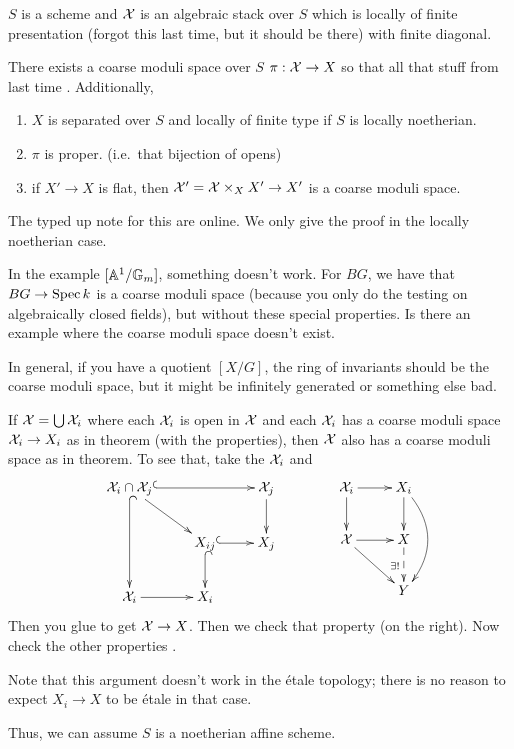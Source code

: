 $S$ is a scheme and $\mathcal{X}$ is an algebraic stack over $S$ which is
locally of finite presentation (forgot this last time, but it should
be there) with finite diagonal.
\begin{theorem}\label{lec38T:some}
  There exists a coarse moduli space over $S$ $\pi:\mathcal{X}\to X$ so that
all that stuff from last time \anton{}. Additionally,
  \begin{enumerate}
   \item $X$ is separated over $S$ and locally of finite type if $S$
is locally noetherian.
   \item $\pi$ is proper. (i.e.~that bijection of opens)
   \item if $X'\to X$ is flat, then $\mathcal{X}'=\mathcal{X}\times_X X'\to X'$ is a
coarse moduli space.
  \end{enumerate}
\end{theorem}
The typed up note for this are online. We only give the proof in the
locally noetherian case.

In the example $[\mathbb{A}^1/\mathbb{G}_m]$, something doesn't work. For $BG$, we
have that $BG\to \operatorname{Spec} k$ is a coarse moduli space (because you only
do the testing on algebraically closed fields), but without these
special properties. Is there an example where the coarse moduli space
doesn't exist.

In general, if you have a quotient $[X/G]$, the ring of invariants
should be the coarse moduli space, but it might be infinitely
generated or something else bad.

\begin{remark}
  If $\mathcal{X}=\bigcup \mathcal{X}_i$ where each $\mathcal{X}_i$ is open in $\mathcal{X}$ and each
$\mathcal{X}_i$ has a coarse moduli space $\mathcal{X}_i\to X_i$ as in theorem (with
the properties), then $\mathcal{X}$ also has a coarse moduli space as in
theorem. To see that, take the $\mathcal{X}_i$ and
  \[\xymatrix{
    \X_i\cap \X_j \ar@{^(->}[rr]\ar@{^(->}[dd] \ar[dr] & &
\X_j\ar[d]\\
    & X_{ij}\ar@{^(->}[r]\ar@{^(->}[d] & X_j\\
    \X_i\ar[r] & X_i
  }\qquad\qquad \xymatrix{
    \X_i\ar[r] \ar[d] & X_i\ar[d]\ar@/^4ex/[dd]\\
    \X\ar[r]\ar[dr] & X\ar@{-->}[d]_{\exists !}\\
    & Y
  }\]
  Then you glue to get $\mathcal{X}\to X$. Then we check that property (on the
right). Now check the other properties \anton{}.

  Note that this argument doesn't work in the \'etale topology; there
is no reason to expect $X_i\to X$ to be \'etale in that case.
\end{remark}
Thus, we can assume $S$ is a noetherian affine scheme.

